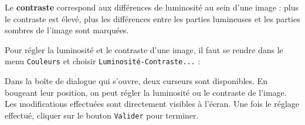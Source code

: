 Le \textbf{contraste} correspond aux différences de luminosité au sein d'une image : plus le contraste est élevé, plus les différences entre les parties lumineuses et les parties sombres de l'image sont marquées.

\vspace{12pt}

Pour régler la luminosité et le contraste d'une image, il faut se rendre dans le menu \texttt{Couleurs} et choisir \texttt{Luminosité-Contraste...} :


Dans la boîte de dialogue qui s'ouvre, deux curseurs sont disponibles. En bougeant leur position, on peut régler la luminosité ou le contraste de l'image. Les modifications effectuées sont directement visibles à l'écran. Une fois le réglage effectué, cliquer sur le bouton \texttt{Valider} pour terminer.  




